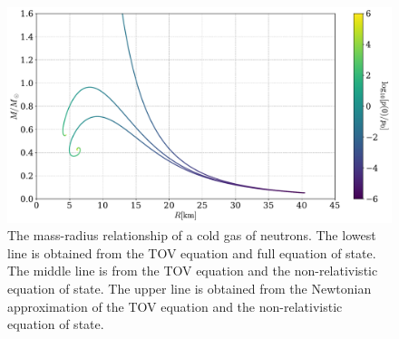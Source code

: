 \begin{figure}[h]
    \centering
    \includegraphics[width=\textwidth]{../scripts/figurer/mass_radius_comparison.pdf}
    \caption{The mass-radius relationship of a cold gas of neutrons. The lowest line is obtained from the TOV equation and full equation of state. The middle line is from the TOV equation and the non-relativistic equation of state. The upper line is obtained from the Newtonian approximation of the TOV equation and the non-relativistic equation of state.}
    \label{fig: mass radius relationship comparison}
\end{figure}


